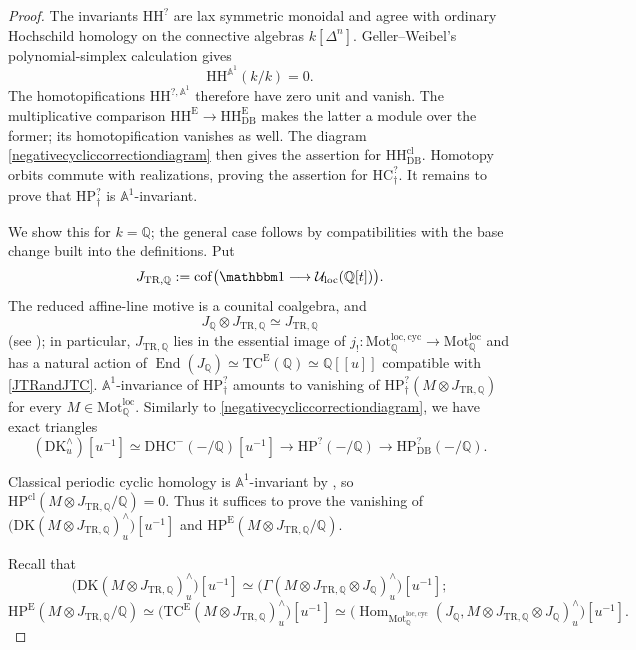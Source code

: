 \documentclass{amsart}
\theoremstyle{plain}
\theoremstyle{definition}
\newcommand{\ra}{\rightarrow}
\newcommand{\bbA}{\mathbb{A}}
\newcommand{\bbQ}{\mathbb{Q}}
\newcommand{\Motloc}{\mathrm{Mot}^{\mathrm{loc}}}
\newcommand{\Motloccyc}{\mathrm{Mot}^{\mathrm{loc},\mathrm{cyc}}}
\newcommand{\Uloc}{\mathcal U_{\mathrm{loc}}}
\newcommand{\TC}{\mathrm{TC}}
\newcommand{\HH}{\mathrm{HH}}
\newcommand{\HC}{\mathrm{HC}}
\newcommand{\HP}{\mathrm{HP}}
\newcommand{\cof}{\mathrm{cof}}
\newcommand{\DK}{\mathrm{DK}}
\newcommand{\TR}{\mathrm{TR}}
\newcommand{\DHC}{\mathrm{DHC}}
\DeclareMathOperator{\Hom}{Hom}
\DeclareMathOperator{\End}{End}
\newcommand{\DB}{\mathrm{DB}}
\newcommand{\cl}{\mathrm{cl}}
\begin{document}
\begin{proof}
The invariants $\HH^?$ are lax symmetric monoidal and agree with ordinary Hochschild homology on the connective algebras
$k[\Delta^n]$. Geller--Weibel's polynomial-simplex calculation
\cite{GW89} gives
\[
\HH^{\bbA^1}(k/k)=0.
\]
The homotopifications $\HH^{?, \bbA^1}$ therefore have zero unit and vanish.
The multiplicative comparison $\HH^{\mathrm{E}}\to \HH^{\mathrm{E}}_{\DB}$ makes the latter a module over the former; its homotopification vanishes as well.
The diagram \eqref{negativecycliccorrectiondiagram}
then gives the assertion for $\HH^{\cl}_{\DB}$.
Homotopy orbits commute with realizations, proving the assertion for $\HC^?_\dagger$. It remains to prove that $\HP^?_\dagger$ is $\bbA^1$-invariant.

We show this for $k=\bbQ$;
the general case follows by compatibilities with the base change built into the definitions. Put
\[
J_{\TR,\bbQ}:=\cof\bigl(\mathbbm1\longrightarrow\Uloc(\bbQ[t])\bigr).
\]
The
reduced affine-line motive is a counital coalgebra, and
\begin{equation}\label{JTRandJTC}
J_\bbQ\otimes J_{\TR,\bbQ}\simeq J_{\TR,\bbQ}\end{equation} (see \cite[sections 8 and 9.1]{Efi25b}); in particular, $J_{\TR,\bbQ}$ lies in the essential image of $j_!:\Motloccyc_\bbQ\ra \Motloc_\bbQ$ and has a natural action of $\End(J_\bbQ)\simeq \TC^{\mathrm{E}}(\bbQ)\simeq \bbQ[[u]]$ compatible with \eqref{JTRandJTC}. $\bbA^1$-invariance of $\HP^?_\dagger$ amounts to vanishing of $\HP^?_\dagger(M\otimes J_{\TR,\bbQ})$ for every $M\in \Motloc_\bbQ$. Similarly to \eqref{negativecycliccorrectiondiagram}, we have exact triangles
\[
(\DK^\wedge_u)[u^{-1}]
\simeq \DHC^-(-/\bbQ)[u^{-1}]
\longrightarrow \HP^?(-/\bbQ)
\longrightarrow \HP^?_{\DB}(-/\bbQ).
\]




Classical periodic cyclic homology is $\bbA^1$-invariant by \cite{GW89}, so
$\HP^{\cl}(M\otimes J_{\TR,\bbQ}/\bbQ)=0$. 
Thus it suffices to prove the vanishing of
$\bigl(\DK(M\otimes J_{\TR,\bbQ})^\wedge_u\bigr)[u^{-1}]$
and $\HP^{\mathrm{E}}(M\otimes J_{\TR,\bbQ}/\bbQ)$.

Recall that
\[
\bigl(\DK(M\otimes J_{\TR,\bbQ})^\wedge_u\bigr)[u^{-1}]
\simeq
\bigl(\Gamma(M\otimes J_{\TR,\bbQ}\otimes J_\bbQ)^\wedge_u\bigr)
[u^{-1}];
\]
\[
\HP^{\mathrm{E}}(M\otimes J_{\TR,\mathbb Q}/\mathbb Q)
\simeq
\bigl(\TC^{\mathrm{E}}(M\otimes J_{\TR,\mathbb Q})^\wedge_u\bigr)[u^{-1}]\simeq  \bigl(\Hom_{\Motloccyc_\bbQ}(J_\bbQ, M\otimes J_{\TR,\bbQ}\otimes J_\bbQ)^\wedge_u\bigr)[u^{-1}].
\]



\end{proof}
\end{document}
